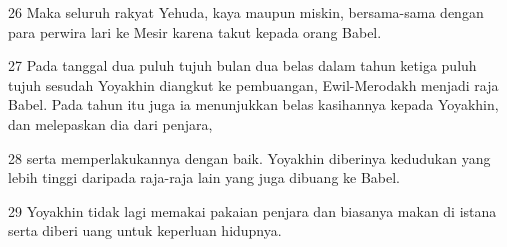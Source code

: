 \par 26 Maka seluruh rakyat Yehuda, kaya maupun miskin, bersama-sama dengan para perwira lari ke Mesir karena takut kepada orang Babel.
\par 27 Pada tanggal dua puluh tujuh bulan dua belas dalam tahun ketiga puluh tujuh sesudah Yoyakhin diangkut ke pembuangan, Ewil-Merodakh menjadi raja Babel. Pada tahun itu juga ia menunjukkan belas kasihannya kepada Yoyakhin, dan melepaskan dia dari penjara,
\par 28 serta memperlakukannya dengan baik. Yoyakhin diberinya kedudukan yang lebih tinggi daripada raja-raja lain yang juga dibuang ke Babel.
\par 29 Yoyakhin tidak lagi memakai pakaian penjara dan biasanya makan di istana serta diberi uang untuk keperluan hidupnya.


